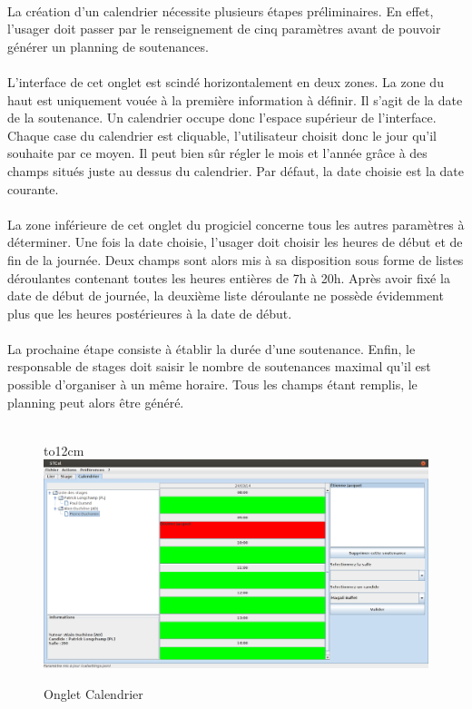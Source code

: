 \documentclass[a4paper,10pt]{report}
\begin{document}
	      \paragraph{}  
		La création d'un calendrier nécessite plusieurs étapes préliminaires.
		En effet, l'usager doit passer par le renseignement de cinq paramètres avant de pouvoir générer un planning de soutenances.
		
	      \paragraph{}
		L'interface de cet onglet est scindé horizontalement en deux zones.
		La zone du haut est uniquement vouée à la première information à définir.
		Il s'agit de la date de la soutenance.
		Un calendrier occupe donc l'espace supérieur de l'interface.
		Chaque case du calendrier est cliquable, l'utilisateur choisit donc le jour qu'il souhaite par ce moyen.
		Il peut bien sûr régler le mois et l'année grâce à des champs situés juste au dessus du calendrier.
		Par défaut, la date choisie est la date courante.
		
	      \paragraph{}
		La zone inférieure de cet onglet du progiciel concerne tous les autres paramètres à déterminer.
		Une fois la date choisie, l'usager doit choisir les heures de début et de fin de la journée.
		Deux champs sont alors mis à sa disposition sous forme de listes déroulantes contenant toutes les heures entières de 7h à 20h.
		Après avoir fixé la date de début de journée, la deuxième liste déroulante ne possède évidemment plus que les heures postérieures à la date de début.
		
	      \paragraph{}
		La prochaine étape consiste à établir la durée d'une soutenance.
		Enfin, le responsable de stages doit saisir le nombre de soutenances maximal qu'il est possible d'organiser à un même horaire.
		Tous les champs étant remplis, le planning peut alors être généré.
		~\\~\\
		
		\begin{figure}[!h]
		\hbox to12cm{\hss\includegraphics[width=18cm]{Calendrier2.png}\hss}
		\caption{Onglet Calendrier}
		\end{figure}
		
\end{document}
